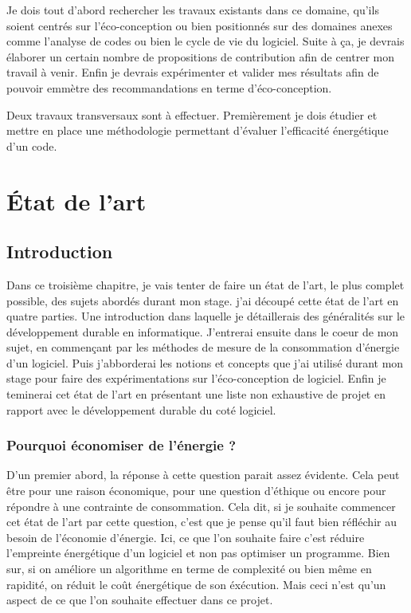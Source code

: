 \documentclass[a4paper, 11pt]{report}
\begin{document}
Je dois tout d'abord rechercher les travaux existants dans ce domaine, qu'ils soient centrés sur l'éco-conception ou bien positionnés sur des domaines anexes comme l'analyse de codes ou bien le cycle de vie du logiciel. Suite à ça, je devrais élaborer un certain nombre de propositions de contribution afin de centrer mon travail à venir. Enfin je devrais expérimenter et valider mes résultats afin de pouvoir emmètre des recommandations en terme d'éco-conception.

Deux travaux transversaux sont à effectuer. Premièrement je dois étudier et mettre en place une méthodologie permettant d'évaluer l'efficacité énergétique d'un code.

\chapter{État de l'art}
	\section{Introduction}
Dans ce troisième chapitre, je vais tenter de faire un état de l'art, le plus complet possible, des sujets abordés durant mon stage. j'ai découpé cette état de l'art en quatre parties. Une introduction dans laquelle je détaillerais des généralités sur le développement durable en informatique. J'entrerai ensuite dans le coeur de mon sujet, en commençant par les méthodes de mesure de la consommation d'énergie d'un logiciel. Puis j'abborderai les notions et concepts que j'ai utilisé durant mon stage pour faire des expérimentations sur l'éco-conception de logiciel. Enfin je teminerai cet état de l'art en présentant une liste non exhaustive de projet en rapport avec le développement durable du coté logiciel.

		\subsection{Pourquoi économiser de l'énergie ?}
D'un premier abord, la réponse à cette question parait assez évidente. Cela peut être pour une raison économique, pour une question d'éthique ou encore pour répondre à une contrainte de consommation. Cela dit, si je souhaite commencer cet état de l'art par cette question, c'est que je pense qu'il faut bien réfléchir au besoin de l'économie d'énergie. Ici, ce que l'on souhaite faire c'est réduire l'empreinte énergétique d'un logiciel et non pas optimiser un programme. Bien sur, si on améliore un algorithme en terme de complexité ou bien même en rapidité, on réduit le coût énergétique de son éxécution. Mais ceci n'est qu'un aspect de ce que l'on souhaite effectuer dans ce projet. 
\end{document}
